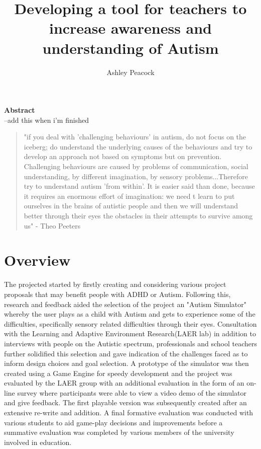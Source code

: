 \documentclass[11pt]{report}
\begin{document}
\title{Developing a tool for teachers to increase awareness and understanding of Autism}
\author{Ashley Peacock}
\maketitle

\textbf{Abstract}\\
--add this when i'm finished 

\begin{quote}
"if you deal with 'challenging behaviours' in autism, do not focus on the iceberg; do understand the underlying causes of the behaviours and try to develop an approach not based on symptoms but on prevention. Challenging behaviours are caused by problems of communication, social understanding, by different imagination, by sensory problems...Therefore try to understand autism 'from within'. It is easier said than done, because it requires an enormous effort of imagination: we need t learn to put ourselves in the brains of autistic people and then we will understand better through their eyes the obstacles in their attempts to survive among us" - Theo Peeters \cite{olgab}
\end{quote}

\tableofcontents

\chapter{Overview}

The projected started by firstly creating and considering various project proposals that may benefit people with ADHD or Autism. Following this, research and feedback aided the selection of the project an "Autism Simulator" whereby the user plays as a child with Autism and gets to experience some of the difficulties, specifically sensory related difficulties through their eyes. Consultation with the Learning and Adaptive Environment Research(LAER lab) in addition to interviews with people on the Autistic spectrum, professionals and school teachers further solidified this selection and gave indication of the challenges faced as to inform design choices and goal selection. A prototype of the simulator was then created using a Game Engine for speedy development and the project was evaluated by the LAER group with an additional evaluation in the form of an on-line survey where participants were able to view a video demo of the simulator and give feedback. The first playable version was subsequently created after an extensive re-write and addition. A final formative evaluation was conducted with various students to aid game-play decisions and improvements before a summative evaluation was completed by various members of the university involved in education. 
\end{document}
